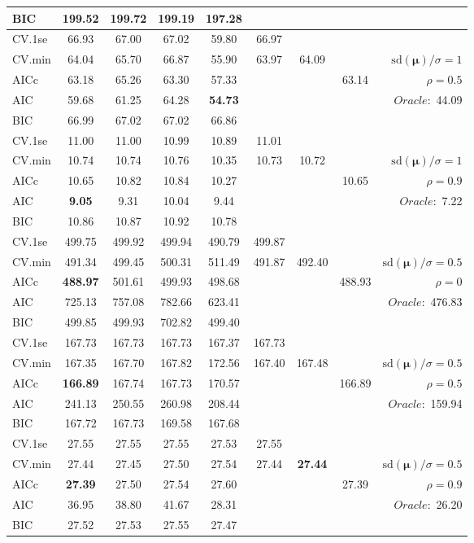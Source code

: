\begin{table}
\begin{center}
\begin{tabular}{l*{7}{c}|r}
BIC & 199.52 & 199.72 & 199.19 & 197.28 & & & &  \\
 \hline 
CV.1se & 66.93 & 67.00 & 67.02 & 59.80 & 66.97 & & & \\
CV.min & 64.04 & 65.70 & 66.87 & 55.90 & 63.97 & 64.09 & & $\mathrm{sd}(\mathbf{\mu})/\sigma=1$ \\
AICc & 63.18 & 65.26 & 63.30 & 57.33 & & & 63.14 &  $\rho=0.5$ \\
AIC & 59.68 & 61.25 & 64.28 & {\bf 54.73} & & & &  \multirow{2}{*}{$Oracle: $ 44.09} \\
BIC & 66.99 & 67.02 & 67.02 & 66.86 & & & &  \\
 \hline 
CV.1se & 11.00 & 11.00 & 10.99 & 10.89 & 11.01 & & & \\
CV.min & 10.74 & 10.74 & 10.76 & 10.35 & 10.73 & 10.72 & & $\mathrm{sd}(\mathbf{\mu})/\sigma=1$ \\
AICc & 10.65 & 10.82 & 10.84 & 10.27 & & & 10.65 &  $\rho=0.9$ \\
AIC & {\bf 9.05} & 9.31 & 10.04 & 9.44 & & & &  \multirow{2}{*}{$Oracle: $ 7.22} \\
BIC & 10.86 & 10.87 & 10.92 & 10.78 & & & &  \\
 \hline 
CV.1se & 499.75 & 499.92 & 499.94 & 490.79 & 499.87 & & & \\
CV.min & 491.34 & 499.45 & 500.31 & 511.49 & 491.87 & 492.40 & & $\mathrm{sd}(\mathbf{\mu})/\sigma=0.5$ \\
AICc & {\bf 488.97} & 501.61 & 499.93 & 498.68 & & & 488.93 &  $\rho=0$ \\
AIC & 725.13 & 757.08 & 782.66 & 623.41 & & & &  \multirow{2}{*}{$Oracle: $ 476.83} \\
BIC & 499.85 & 499.93 & 702.82 & 499.40 & & & &  \\
 \hline 
CV.1se & 167.73 & 167.73 & 167.73 & 167.37 & 167.73 & & & \\
CV.min & 167.35 & 167.70 & 167.82 & 172.56 & 167.40 & 167.48 & & $\mathrm{sd}(\mathbf{\mu})/\sigma=0.5$ \\
AICc & {\bf 166.89} & 167.74 & 167.73 & 170.57 & & & 166.89 &  $\rho=0.5$ \\
AIC & 241.13 & 250.55 & 260.98 & 208.44 & & & &  \multirow{2}{*}{$Oracle: $ 159.94} \\
BIC & 167.72 & 167.73 & 169.58 & 167.68 & & & &  \\
 \hline 
CV.1se & 27.55 & 27.55 & 27.55 & 27.53 & 27.55 & & & \\
CV.min & 27.44 & 27.45 & 27.50 & 27.54 & 27.44 & {\bf 27.44} & & $\mathrm{sd}(\mathbf{\mu})/\sigma=0.5$ \\
AICc & {\bf 27.39} & 27.50 & 27.54 & 27.60 & & & 27.39 &  $\rho=0.9$ \\
AIC & 36.95 & 38.80 & 41.67 & 28.31 & & & &  \multirow{2}{*}{$Oracle: $ 26.20} \\
BIC & 27.52 & 27.53 & 27.55 & 27.47 & & & &  \\
 \hline 
\end{tabular}
\end{center}
\vspace{-1cm}
\end{table}





